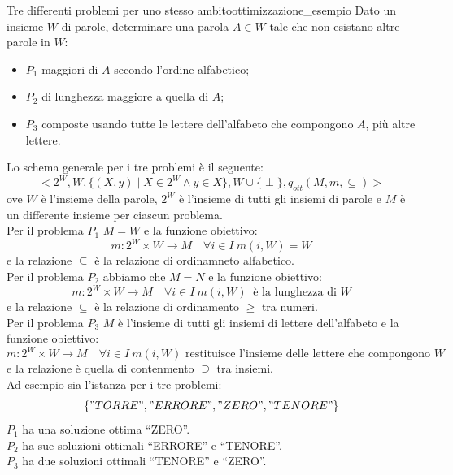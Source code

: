 \documentclass[12pt]{report}
\newcommand{\nmu}{}
\begin{document}
   	\begin{example}{\nmu Tre differenti problemi per uno stesso ambito}{ottimizzazione_esempio}
   		Dato un insieme $W$ di parole, determinare una parola $A \in W$ tale che non esistano altre parole in $W$:
   		\begin{itemize}
   			\item $P_1$ maggiori di $A$ secondo l'ordine alfabetico;
   			\item $P_2$ di lunghezza maggiore a quella di $A$;
   			\item $P_3$ composte usando tutte le lettere dell'alfabeto che compongono $A$, più altre lettere.
   		\end{itemize}
   		Lo schema generale per i tre problemi è il seguente:
   		\[
   		<2^W, W, \{(X, y) \mid X \in 2^W \wedge y \in X\}, W \cup \{\perp\}, q_{ott}(M, m, \subseteq)>
   		\]
   		ove $W$ è l'insieme della parole, $2^W$ è l'insieme di tutti gli insiemi di parole e $M$ è un differente insieme per ciascun problema. \\
   		Per il problema $P_1$ $M = W$ e la funzione obiettivo:
   		\[
   		m: 2^W \times W \to M \quad \forall i \in I\ m(i, W) = W
   		\]
		e la relazione $\subseteq$ è la relazione di ordinamneto alfabetico. \\
		Per il problema $P_2$ abbiamo che $M = N$ e la funzione obiettivo:
		\[
		m: 2^W \times W \to M \quad \forall i \in I\ m(i, W)\ \text{ è la lunghezza di $W$}
		\]
		e la relazione $\subseteq$ è la relazione di ordinamento $\geq$ tra numeri. \\
		Per il problema $P_3$ $M$ è l'insieme di tutti gli insiemi di lettere dell'alfabeto e la funzione obiettivo:
		\[
		m: 2^W\times W\to M \quad \forall i \in I\ m(i, W) \text{ restituisce l'insieme delle lettere che compongono $W$}
		\]
		e la relazione è quella di contenmento $\supseteq$ tra insiemi. \\
		Ad esempio sia l'istanza per i tre problemi:
		\[
		\{"TORRE", "ERRORE", "ZERO", "TENORE"\}
		\]
		$P_1$ ha una soluzione ottima ``ZERO''. \\
		$P_2$ ha sue soluzioni ottimali ``ERRORE'' e ``TENORE''. \\
		$P_3$ ha due soluzioni ottimali ``TENORE'' e ``ZERO''.
   	\end{example}
\end{document}
